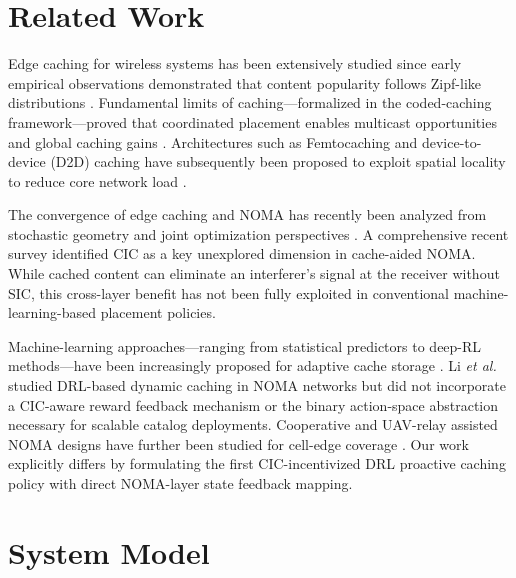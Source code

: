 \documentclass[conference]{IEEEtran}
\begin{document}
\section{Related Work}

Edge caching for wireless systems has been extensively studied since early empirical observations demonstrated that content popularity follows Zipf-like distributions \cite{b_breslau_zipf}. Fundamental limits of caching---formalized in the coded-caching framework---proved that coordinated placement enables multicast opportunities and global caching gains \cite{b_maddah_ali}. Architectures such as Femtocaching and device-to-device (D2D) caching have subsequently been proposed to exploit spatial locality to reduce core network load \cite{b_golrezaei, b_ji_d2d}.

The convergence of edge caching and NOMA has recently been analyzed from stochastic geometry \cite{b_zhang_stochastic} and joint optimization perspectives \cite{b_cao_joint, b_guo_edge}. A comprehensive recent survey \cite{b_survey_bepari} identified CIC as a key unexplored dimension in cache-aided NOMA. While cached content can eliminate an interferer's signal at the receiver without SIC, this cross-layer benefit has not been fully exploited in conventional machine-learning-based placement policies.

Machine-learning approaches---ranging from statistical predictors to deep-RL methods---have been increasingly proposed for adaptive cache storage \cite{b_chen_ml, b_elghariani_pred}. Li \textit{et al.} \cite{b_li_drl} studied DRL-based dynamic caching in NOMA networks but did not incorporate a CIC-aware reward feedback mechanism or the binary action-space abstraction necessary for scalable catalog deployments. Cooperative and UAV-relay assisted NOMA designs have further been studied for cell-edge coverage \cite{b_bepari_partial, b_liu_uav}. Our work explicitly differs by formulating the first CIC-incentivized DRL proactive caching policy with direct NOMA-layer state feedback mapping.


\section{System Model}
\end{document}
